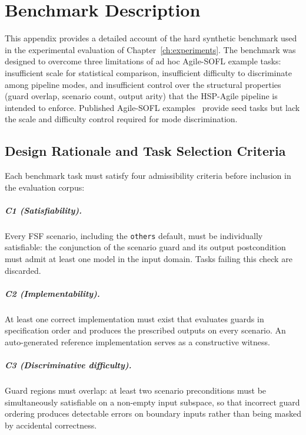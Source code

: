 \chapter{Benchmark Description}
\label{app:benchmark}

This appendix provides a detailed account of the hard synthetic benchmark
used in the experimental evaluation of Chapter~\ref{ch:experiments}.  The
benchmark was designed to overcome three limitations of ad hoc
Agile-SOFL example tasks: insufficient scale for statistical comparison,
insufficient difficulty to discriminate among pipeline modes, and
insufficient control over the structural properties (guard overlap, scenario
count, output arity) that the HSP-Agile pipeline is intended to enforce.
Published Agile-SOFL examples~\citep{liu2014sofl,li2022agilesofl} provide seed tasks but lack
the scale and difficulty control required for mode discrimination.

\section{Design Rationale and Task Selection Criteria}
\label{sec:bench:criteria}

Each benchmark task must satisfy four admissibility criteria before inclusion
in the evaluation corpus:

\paragraph{C1 (Satisfiability).}
Every FSF scenario, including the \texttt{others} default, must be
individually satisfiable: the conjunction of the scenario guard and
its output postcondition must admit at least one model in the input
domain.  Tasks failing this check are discarded.

\paragraph{C2 (Implementability).}
At least one correct implementation must exist that evaluates guards
in specification order and produces the prescribed outputs on every
scenario.  An auto-generated reference implementation serves as a
constructive witness.

\paragraph{C3 (Discriminative difficulty).}
Guard regions must overlap: at least two scenario preconditions must
be simultaneously satisfiable on a non-empty input subspace, so that
incorrect guard ordering produces detectable errors on boundary inputs
rather than being masked by accidental correctness.

